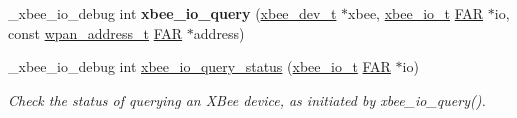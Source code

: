 \begin{DoxyCompactItemize}
\+\_\+xbee\+\_\+io\+\_\+debug int {\bfseries xbee\+\_\+io\+\_\+query} (\hyperlink{structxbee__dev__t}{xbee\+\_\+dev\+\_\+t} $\ast$xbee, \hyperlink{structxbee__io__t}{xbee\+\_\+io\+\_\+t} \hyperlink{group__hal_gaef060b3456fdcc093a7210a762d5f2ed}{F\+AR} $\ast$io, const \hyperlink{structwpan__address__t}{wpan\+\_\+address\+\_\+t} \hyperlink{group__hal_gaef060b3456fdcc093a7210a762d5f2ed}{F\+AR} $\ast$address)
\item 
\+\_\+xbee\+\_\+io\+\_\+debug int \hyperlink{group__xbee__io_gad253478285335c84b310aafb13aa1b21}{xbee\+\_\+io\+\_\+query\+\_\+status} (\hyperlink{structxbee__io__t}{xbee\+\_\+io\+\_\+t} \hyperlink{group__hal_gaef060b3456fdcc093a7210a762d5f2ed}{F\+AR} $\ast$io)
\begin{DoxyCompactList}\small\item\em Check the status of querying an X\+Bee device, as initiated by xbee\+\_\+io\+\_\+query(). \end{DoxyCompactList}\end{DoxyCompactItemize}
